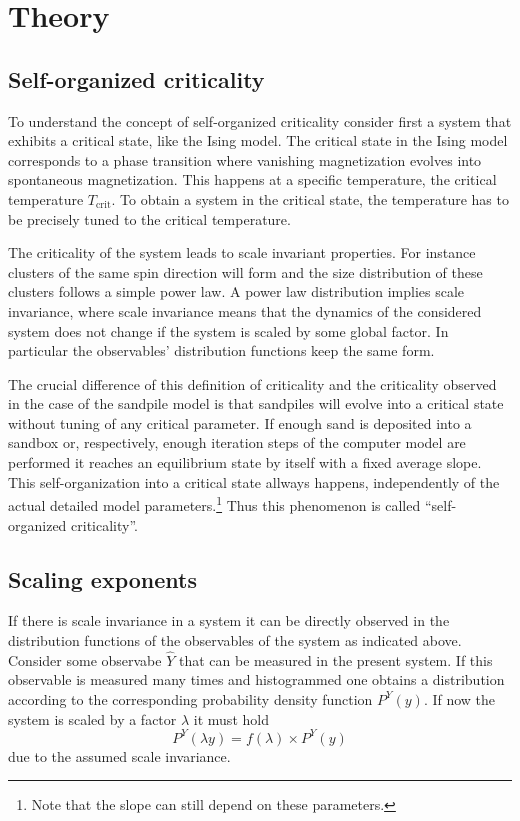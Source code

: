 \section{Theory}
\label{sec:theory}

\subsection{Self-organized criticality}
\label{sec:th:SOC}
To understand the concept of self-organized criticality consider first a system that exhibits a critical state,
like the Ising model. The critical state in the Ising model corresponds to a phase transition where vanishing
magnetization evolves into spontaneous magnetization. This happens at a specific temperature, the critical temperature
$T_{\mathrm{crit}}$. To obtain a system in the critical state, the temperature has to be precisely tuned to the critical
temperature.

The criticality of the system leads to scale invariant properties. For instance clusters of the same spin direction
will form and the size distribution of these clusters follows a simple power law. A power law distribution implies
scale invariance, where scale invariance means that the dynamics of the considered system does not change if the system
is scaled by some global factor. In particular the observables' distribution functions keep the same form.

The crucial difference of this definition of criticality and the criticality observed in the case of the sandpile model
is that sandpiles will evolve into a critical state without tuning of any critical parameter.
If enough sand is deposited into a sandbox or, respectively, enough iteration steps of the computer model are performed
it reaches an equilibrium state by itself with a fixed average slope. This self-organization into a critical state
allways happens, independently of the actual detailed model parameters.\footnote{Note that the slope can still depend
on these parameters.} Thus this phenomenon is called \enquote{self-organized criticality}.

\subsection{Scaling exponents}
\label{sec:th:scaling}
If there is scale invariance in a system it can be directly observed in the distribution functions
of the observables of the system as indicated above. Consider some observabe $\hat{Y}$ that can be measured in the
present system. If this observable is measured many times and histogrammed one obtains a distribution according to the
corresponding probability density function $P^{Y}(y)$.
If now the system is scaled by a factor $\lambda$ it must hold
\begin{equation}\label{eq:scalingCondition}
P^{Y}(\lambda y) = f(\lambda) \times P^{Y}(y)
\end{equation}
due to the assumed scale invariance.

